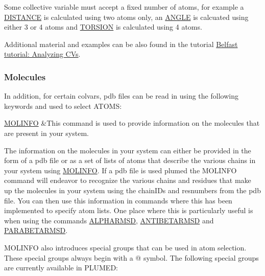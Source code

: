 Some collective variable must accept a fixed number of atoms, for example a \hyperlink{DISTANCE}{D\+I\+S\+T\+A\+N\+C\+E} is calculated using two atoms only, an \hyperlink{ANGLE}{A\+N\+G\+L\+E} is calcuated using either 3 or 4 atoms and \hyperlink{TORSION}{T\+O\+R\+S\+I\+O\+N} is calculated using 4 atoms.

Additional material and examples can be also found in the tutorial \hyperlink{belfast-1}{Belfast tutorial\+: Analyzing C\+Vs}.\hypertarget{_group_mols}{}\subsubsection{Molecules}\label{_group_mols}
In addition, for certain colvars, pdb files can be read in using the following keywords and used to select A\+T\+O\+M\+S\+:

\begin{TabularC}{2}
\hline
\hyperlink{MOLINFO}{M\+O\+L\+I\+N\+F\+O}  &This command is used to provide information on the molecules that are present in your system.  \\
\end{TabularC}


The information on the molecules in your system can either be provided in the form of a pdb file or as a set of lists of atoms that describe the various chains in your system using \hyperlink{MOLINFO}{M\+O\+L\+I\+N\+F\+O}. If a pdb file is used plumed the M\+O\+L\+I\+N\+F\+O command will endeavor to recognize the various chains and residues that make up the molecules in your system using the chain\+I\+Ds and resnumbers from the pdb file. You can then use this information in commands where this has been implemented to specify atom lists. One place where this is particularly useful is when using the commands \hyperlink{ALPHARMSD}{A\+L\+P\+H\+A\+R\+M\+S\+D}, \hyperlink{ANTIBETARMSD}{A\+N\+T\+I\+B\+E\+T\+A\+R\+M\+S\+D} and \hyperlink{PARABETARMSD}{P\+A\+R\+A\+B\+E\+T\+A\+R\+M\+S\+D}.

M\+O\+L\+I\+N\+F\+O also introduces special groups that can be used in atom selection. These special groups always begin with a @ symbol. The following special groups are currently available in P\+L\+U\+M\+E\+D\+:

